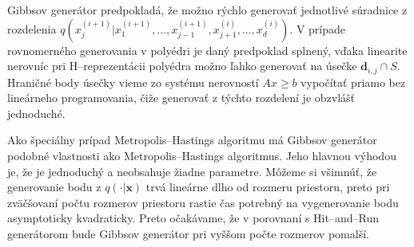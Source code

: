 Gibbsov generátor predpokladá, že možno rýchlo generovať jednotlivé súradnice z rozdelenia $q(x^{(i+1)}_j|x^{(i+1)}_1, \dots, x^{(i+1)}_{j-1}, x^{(i)}_{j+1}, \dots, x^{(i)}_d)$. V prípade rovnomerného generovania v polyédri je daný predpoklad splnený, vďaka linearite nerovníc pri H--reprezentácii polyédra možno ľahko generovať na úsečke $\mathbf d_{i,j} \cap S$. Hraničné body úsečky vieme zo systému nerovností $Ax \geq b$ vypočítať priamo bez lineárneho programovania, čiže generovať z týchto rozdelení je obzvlášť jednoduché.

Ako špeciálny prípad Metropolis--Hastings algoritmu má Gibbsov generátor podobné vlastnosti ako Metropolis--Hastings algoritmus. Jeho hlavnou výhodou je, že je jednoduchý a neobsahuje žiadne parametre. Môžeme si všimnúť, že generovanie bodu z $q(\cdot|\mathbf x)$ trvá lineárne dlho od rozmeru priestoru, preto pri zväčšovaní počtu rozmerov priestoru rastie čas potrebný na vygenerovanie bodu asymptoticky kvadraticky. Preto očakávame, že v porovnaní s Hit--and--Run generátorom bude Gibbsov generátor pri vyššom počte rozmerov pomalší.
